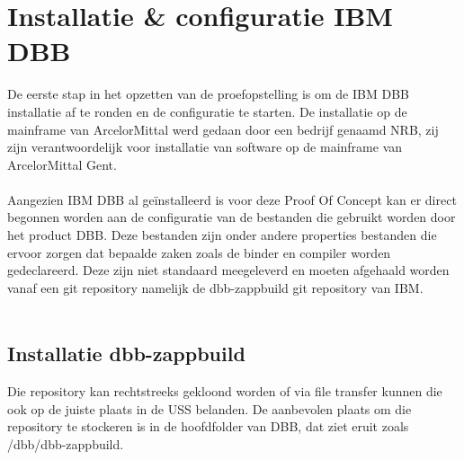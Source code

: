\section{Installatie \& configuratie IBM DBB}
\label{sec:installdbb}
De eerste stap in het opzetten van de proefopstelling is om de IBM DBB installatie af te ronden en de configuratie te starten. De installatie op de mainframe van ArcelorMittal werd gedaan door een bedrijf genaamd NRB, zij zijn verantwoordelijk voor installatie van software op de mainframe van ArcelorMittal Gent. 
\\ \\
Aangezien IBM DBB al geïnstalleerd is voor deze Proof Of Concept kan er direct begonnen worden aan de configuratie van de bestanden die gebruikt worden door het product DBB. Deze bestanden zijn onder andere properties bestanden die ervoor zorgen dat bepaalde zaken zoals de binder en compiler worden gedeclareerd. Deze zijn niet standaard meegeleverd en moeten afgehaald worden vanaf een git repository namelijk de dbb-zappbuild git repository van IBM. 
\\ \\
\subsection{Installatie dbb-zappbuild}
Die repository kan rechtstreeks gekloond worden of via file transfer kunnen die ook op de juiste plaats in de USS belanden. De aanbevolen plaats om die repository te stockeren is in de hoofdfolder van DBB, dat ziet eruit zoals /dbb/dbb-zappbuild.
\\ \\
